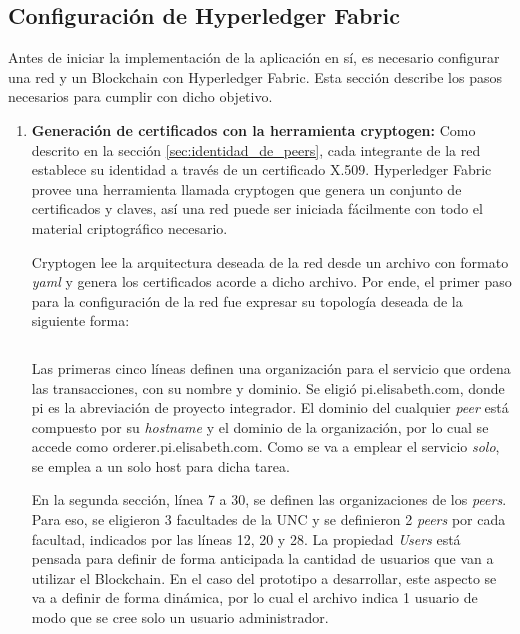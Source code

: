 \subsection{Configuración de Hyperledger Fabric}
Antes de iniciar la implementación de la aplicación en sí, es necesario configurar una red y un Blockchain con Hyperledger Fabric. Esta sección describe los pasos necesarios para cumplir con dicho objetivo.
\begin{enumerate}
    \item \textbf{Generación de certificados con la herramienta cryptogen:} Como descrito en la sección \ref{sec:identidad_de_peers}, cada integrante de la red establece su identidad a través de un certificado X.509. Hyperledger Fabric provee una herramienta llamada cryptogen que genera un conjunto de certificados y claves, así una red puede ser iniciada fácilmente con todo el material criptográfico necesario.
    
    Cryptogen lee la arquitectura deseada de la red desde un archivo con formato \textit{yaml} y genera los certificados acorde a dicho archivo. Por ende, el primer paso para la configuración de la red fue expresar su topología deseada de la siguiente forma:
    \inputminted[linenos, bgcolor=mygray]{yaml}{Listings/crypto-config.yaml}
    Las primeras cinco líneas definen una organización para el servicio que ordena las transacciones, con su nombre y dominio. Se eligió pi.elisabeth.com, donde pi es la abreviación de proyecto integrador. El dominio del cualquier \textit{peer} está compuesto por su \textit{hostname} y el dominio de la organización, por lo cual se accede como orderer.pi.elisabeth.com. Como se va a emplear el servicio \textit{solo}, se emplea a un solo host para dicha tarea.

    En la segunda sección, línea 7 a 30, se definen las organizaciones de los \textit{peers}. Para eso, se eligieron 3 facultades de la UNC y se definieron 2 \textit{peers} por cada facultad, indicados por las líneas 12, 20 y 28. La propiedad \textit{Users} está pensada para definir de forma anticipada la cantidad de usuarios que van a utilizar el Blockchain. En el caso del prototipo a desarrollar, este aspecto se va a definir de forma dinámica, por lo cual el archivo indica 1 usuario de modo que se cree solo un usuario administrador.
    

\end{enumerate}
